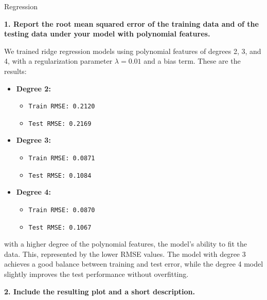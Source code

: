 \documentclass[
	english,
        solution=true
	]{tudaexercise}
\begin{document}
\begin{task}[points=34]{Regression}
\begin{subtask}[points=8, title=Polynomial Features]
        \begin{solution}
            \textbf{1. Report the root mean squared error of the training data and of the testing data under your model with polynomial features.}

            We trained ridge regression models using polynomial features of degrees 2, 3, and 4, with a regularization parameter $\lambda = 0.01$ and a bias term.
            These are the results:

            \begin{itemize}
                \item \textbf{Degree 2:}
                \begin{itemize}
                    \item \texttt{Train RMSE: 0.2120}
                    \item \texttt{Test RMSE: 0.2169}
                \end{itemize}
                \item \textbf{Degree 3:}
                \begin{itemize}
                    \item \texttt{Train RMSE: 0.0871}
                    \item \texttt{Test RMSE: 0.1084}
                \end{itemize}
                \item \textbf{Degree 4:}
                \begin{itemize}
                    \item \texttt{Train RMSE: 0.0870}
                    \item \texttt{Test RMSE: 0.1067}
                \end{itemize}
            \end{itemize}

            with a higher degree of the polynomial features, the model's ability to fit the data.
            This, represented by the lower RMSE values.
            The model with degree 3 achieves a good balance between training and test error, while the degree 4 model slightly improves the test performance without overfitting.

            \vspace{2em}

            \textbf{2. Include the resulting plot and a short description.}


\end{solution}
\end{subtask}
\end{task}
\end{document}
